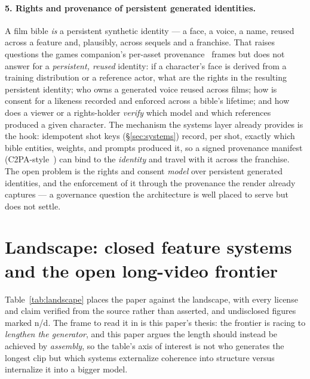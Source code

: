 \documentclass[11pt]{article}
\begin{document}
\paragraph{5. Rights and provenance of persistent generated identities.} A film bible \emph{is} a persistent
synthetic identity --- a face, a voice, a name, reused across a feature and, plausibly, across sequels and a
franchise. That raises questions the games companion's per-asset provenance~\cite{games} frames but does not
answer for a \emph{persistent, reused} identity: if a character's face is derived from a training distribution or
a reference actor, what are the rights in the resulting persistent identity; who owns a generated voice reused
across films; how is consent for a likeness recorded and enforced across a bible's lifetime; and how does a viewer
or a rights-holder \emph{verify} which model and which references produced a given character. The mechanism the
systems layer already provides is the hook: idempotent shot keys (\S\ref{sec:systems}) record, per shot, exactly
which bible entities, weights, and prompts produced it, so a signed provenance manifest (C2PA-style~\cite{c2pa})
can bind to the \emph{identity} and travel with it across the franchise. The open problem is the rights and
consent \emph{model} over persistent generated identities, and the enforcement of it through the provenance the
render already captures --- a governance question the architecture is well placed to serve but does not settle.

\section{Landscape: closed feature systems and the open long-video frontier}
\label{sec:landscape}

Table~\ref{tab:landscape} places the paper against the landscape, with every license and claim verified from the
source rather than asserted, and undisclosed figures marked n/d. The frame to read it in is this paper's thesis:
the frontier is racing to \emph{lengthen the generator}, and this paper argues the length should instead be
achieved by \emph{assembly}, so the table's axis of interest is not who generates the longest clip but which
systems externalize coherence into structure versus internalize it into a bigger model.
\end{document}
